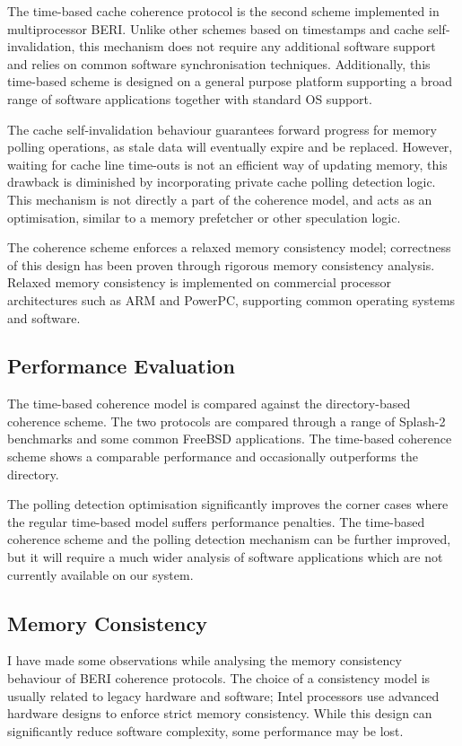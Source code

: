 		The time-based cache coherence protocol is the second scheme implemented in multiprocessor BERI. Unlike other schemes based on timestamps and cache self-invalidation, this mechanism does not require any additional software support and relies on common software synchronisation techniques.
		Additionally, this time-based scheme is designed on a general purpose platform supporting a broad range of software applications together with standard OS support.

		The cache self-invalidation behaviour guarantees forward progress for memory polling operations, as stale data will eventually expire and be replaced. However, waiting for cache line time-outs is not an efficient way of updating memory, this drawback is diminished by incorporating private cache polling detection logic. This mechanism is not directly a part of the coherence model, and acts as an optimisation, similar to a memory prefetcher or other speculation logic.

		The coherence scheme enforces a relaxed memory consistency model; correctness of this design has been proven through rigorous memory consistency analysis. Relaxed memory consistency is implemented on commercial processor architectures such as ARM and PowerPC, supporting common operating systems and software. 
		
		\subsection{Performance Evaluation}
			The time-based coherence model is compared against the directory-based coherence scheme. The two protocols are compared through a range of Splash-2 benchmarks and some common FreeBSD applications. The time-based coherence scheme shows a comparable performance and occasionally outperforms the directory. 
			
			The polling detection optimisation significantly improves the corner cases where the regular time-based model suffers performance penalties. The time-based coherence scheme and the polling detection mechanism can be further improved, but it will require a much wider analysis of software applications which are not currently available on our system.
	
		\subsection{Memory Consistency}
			I have made some observations while analysing the memory consistency behaviour of BERI coherence protocols. The choice of a consistency model is usually related to legacy hardware and software; Intel processors use advanced hardware designs to enforce strict memory consistency. While this design can significantly reduce software complexity, some performance may be lost.
			
